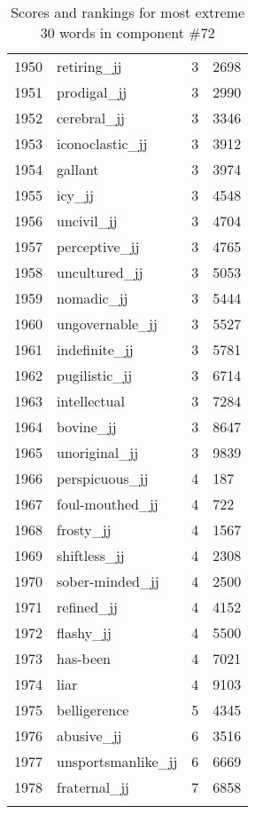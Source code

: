 \begin{longtable}[!htbp]{| rlr@{.}l |}
    1950 & retiring\_jj & 3 & 2698 \\
    1951 & prodigal\_jj & 3 & 2990 \\
    1952 & cerebral\_jj & 3 & 3346 \\
    1953 & iconoclastic\_jj & 3 & 3912 \\
    1954 & gallant & 3 & 3974 \\
    1955 & icy\_jj & 3 & 4548 \\
    1956 & uncivil\_jj & 3 & 4704 \\
    1957 & perceptive\_jj & 3 & 4765 \\
    1958 & uncultured\_jj & 3 & 5053 \\
    1959 & nomadic\_jj & 3 & 5444 \\
    1960 & ungovernable\_jj & 3 & 5527 \\
    1961 & indefinite\_jj & 3 & 5781 \\
    1962 & pugilistic\_jj & 3 & 6714 \\
    1963 & intellectual & 3 & 7284 \\
    1964 & bovine\_jj & 3 & 8647 \\
    1965 & unoriginal\_jj & 3 & 9839 \\
    1966 & perspicuous\_jj & 4 & 187 \\
    1967 & foul-mouthed\_jj & 4 & 722 \\
    1968 & frosty\_jj & 4 & 1567 \\
    1969 & shiftless\_jj & 4 & 2308 \\
    1970 & sober-minded\_jj & 4 & 2500 \\
    1971 & refined\_jj & 4 & 4152 \\
    1972 & flashy\_jj & 4 & 5500 \\
    1973 & has-been & 4 & 7021 \\
    1974 & liar & 4 & 9103 \\
    1975 & belligerence & 5 & 4345 \\
    1976 & abusive\_jj & 6 & 3516 \\
    1977 & unsportsmanlike\_jj & 6 & 6669 \\
    1978 & fraternal\_jj & 7 & 6858 \\
    \hline
    \caption{Scores and rankings for most extreme 30 words in component \#72} \\
\end{longtable}
